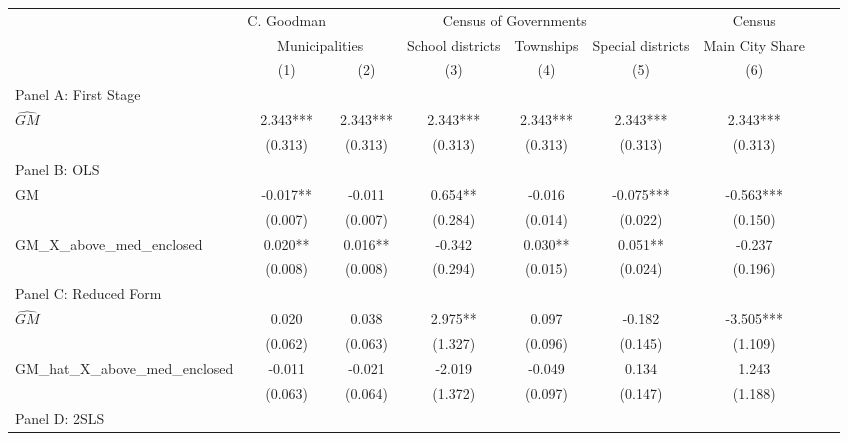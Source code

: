 \begin{tabular}{l*{8}{c}} \toprule
&\multicolumn{1}{c}{C. Goodman}&\multicolumn{4}{c}{Census of Governments}&\multicolumn{1}{c}{Census}\\\cmidrule(lr){2-2}\cmidrule(lr){3-6}\cmidrule(lr){7-7}
&\multicolumn{2}{c}{Municipalities}&\multicolumn{1}{c}{School districts}&\multicolumn{1}{c}{Townships}&\multicolumn{1}{c}{Special districts}&\multicolumn{1}{c}{Main City Share}\\\cmidrule(lr){2-3}\cmidrule(lr){4-6}\cmidrule(lr){7-7}
&\multicolumn{1}{c}{(1)}&\multicolumn{1}{c}{(2)}&\multicolumn{1}{c}{(3)}&\multicolumn{1}{c}{(4)}&\multicolumn{1}{c}{(5)}&\multicolumn{1}{c}{(6)}\\
\cmidrule(lr){1-7}
\multicolumn{6}{l}{Panel A: First Stage}\\
\cmidrule(lr){1-7}
$\widehat{GM}$  &    2.343***&    2.343***&    2.343***&    2.343***&    2.343***&    2.343***\\
                &  (0.313)   &  (0.313)   &  (0.313)   &  (0.313)   &  (0.313)   &  (0.313)   \\
\cmidrule(lr){1-7}
\multicolumn{6}{l}{Panel B: OLS}\\
\cmidrule(lr){1-7}
GM              &   -0.017** &   -0.011   &    0.654** &   -0.016   &   -0.075***&   -0.563***\\
                &  (0.007)   &  (0.007)   &  (0.284)   &  (0.014)   &  (0.022)   &  (0.150)   \\
\addlinespace
GM\_X\_above\_med\_enclosed&    0.020** &    0.016** &   -0.342   &    0.030** &    0.051** &   -0.237   \\
                &  (0.008)   &  (0.008)   &  (0.294)   &  (0.015)   &  (0.024)   &  (0.196)   \\
\cmidrule(lr){1-7}
\multicolumn{6}{l}{Panel C: Reduced Form}\\
\cmidrule(lr){1-7}
$\widehat{GM}$  &    0.020   &    0.038   &    2.975** &    0.097   &   -0.182   &   -3.505***\\
                &  (0.062)   &  (0.063)   &  (1.327)   &  (0.096)   &  (0.145)   &  (1.109)   \\
\addlinespace
GM\_hat\_X\_above\_med\_enclosed&   -0.011   &   -0.021   &   -2.019   &   -0.049   &    0.134   &    1.243   \\
                &  (0.063)   &  (0.064)   &  (1.372)   &  (0.097)   &  (0.147)   &  (1.188)   \\
\cmidrule(lr){1-7}
\multicolumn{6}{l}{Panel D: 2SLS}\\

\end{tabular}
